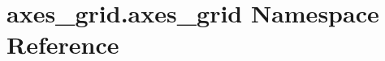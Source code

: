 \hypertarget{namespaceaxes__grid_1_1axes__grid}{}\section{axes\+\_\+grid.\+axes\+\_\+grid Namespace Reference}
\label{namespaceaxes__grid_1_1axes__grid}
